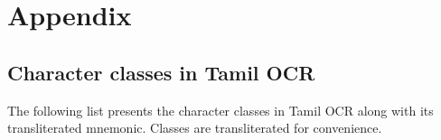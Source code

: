 \appendix

\chapter{Appendix}

\section{Character classes in Tamil OCR}\label{CSET}
The following list presents the character classes in Tamil OCR along with its transliterated mnemonic.
Classes are transliterated for convenience.

% 

